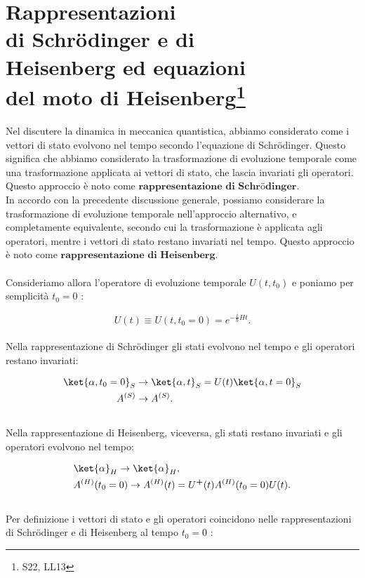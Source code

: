 \chapter[Rappresentazioni di Schrödinger e di Heisenberg]{Rappresentazioni\\ di Schrödinger e di\\ Heisenberg ed equazioni\\ del moto di Heisenberg\footnote{S22, LL13}}

Nel discutere la dinamica in meccanica quantistica, abbiamo considerato come i vettori di stato evolvono nel tempo secondo l'equazione di Schrödinger. Questo significa che abbiamo considerato la trasformazione di evoluzione temporale come una trasformazione applicata ai vettori di stato, che lascia invariati gli operatori. Questo approccio è noto come $\textbf{rappresentazione~di~Schr\"{o}dinger}$.\\
In accordo con la precedente discussione generale, possiamo considerare la trasformazione di evoluzione temporale nell'approccio alternativo, e completamente equivalente, secondo cui la trasformazione è applicata agli operatori, mentre i vettori di stato restano invariati nel tempo. Questo approccio è noto come $\textbf{rappresentazione~di~Heisenberg}$.\\
\\
\noindent Consideriamo allora l'operatore di evoluzione temporale $U(t, t_0)$ e poniamo per semplicità $t_0 = 0$ :
 
\begin{equation}
U(t) \equiv U(t,t_0 = 0) = e^{-\frac{i}{\hbar}Ht}.
\end{equation}
\\
\noindent Nella rappresentazione di Schrödinger gli stati evolvono nel tempo e gli operatori restano invariati:

\begin{align}
\ket{\alpha, t_0 = 0}_S &\rightarrow \ket{\alpha, t}_S = U(t) \ket{\alpha, t=0}_S \nonumber \\
A^{(S)} &\rightarrow A^{(S)}.
\end{align}
\\
\noindent Nella rappresentazione di Heisenberg, viceversa, gli stati restano invariati e gli operatori evolvono nel tempo:

\begin{align}
&\ket{\alpha}_H \rightarrow \ket{\alpha}_H, \\ \nonumber
&A^{(H)}(t_0 = 0) \rightarrow A^{(H)}(t) = U^\textbf{+}(t)A^{(H)}(t_0 = 0)U(t).
\end{align}
\\
\noindent Per definizione i vettori di stato e gli operatori coincidono nelle rappresentazioni di Schrödinger e di Heisenberg al tempo $t_0 = 0$ :

